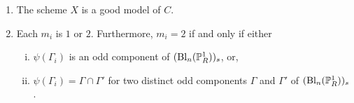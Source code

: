 \begin{lemma}\label{construction} \hfill
\begin{enumerate}[\upshape (a)]
\item The scheme $X$ is a good model of $C$.
\item Each $m_i$ is $1$ or $2$. Furthermore, $m_i = 2$ if and only if either
\begin{enumerate}[(i)]
\item $\psi(\Gamma_i)$ is an odd component of $(\mathrm{Bl}_n(\P^1_R))_s$, or,
\item $\psi(\Gamma_i) = \Gamma \cap \Gamma'$ for two distinct odd components $\Gamma$ and $\Gamma'$ of $(\mathrm{Bl}_n(\P^1_R))_s$.
\end{enumerate}
\end{enumerate} 
\end{lemma}
